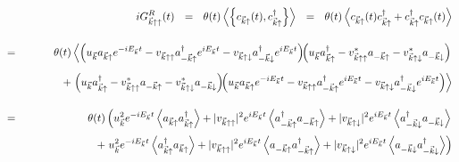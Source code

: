 \documentclass[uplatex,a4j,12pt,dvipdfmx]{jsarticle}
\begin{document}
\begin{eqnarray}
	&&
	i
	G_{\vec{k} \uparrow \uparrow}^{R}(t)
	\ \ = \ \
	\theta(t)
	\left\langle \left\{
	c_{\vec{k} \uparrow}(t), c_{\vec{k} \uparrow}^{\dagger}
	\right\} \right\rangle
	\ \ = \ \
	\theta(t)
	\left\langle
	c_{\vec{k} \uparrow}(t) c_{\vec{k} \uparrow}^{\dagger}
	+
	c_{\vec{k} \uparrow}^{\dagger} c_{\vec{k} \uparrow}(t)
	\right\rangle
	\nonumber \\[4mm] &=&
	\theta(t)
	\left\langle
	\left(
	u_{\vec{k}} a_{\vec{k} \uparrow} e^{- i E_{\vec{k}} t}
	-
	v_{\vec{k} \uparrow \uparrow} a_{-\vec{k} \uparrow}^{\dagger} e^{ i E_{\vec{k}} t}
	-
	v_{\vec{k} \uparrow \downarrow} a_{-\vec{k} \downarrow}^{\dagger} e^{ i E_{\vec{k}} t}
	\right)
	\!\!
	\left(
	u_{\vec{k}} a_{\vec{k} \uparrow}^{\dagger}
	-
	v_{\vec{k} \uparrow \uparrow}^{*} a_{-\vec{k} \uparrow}
	-
	v_{\vec{k} \uparrow \downarrow}^{*} a_{-\vec{k} \downarrow}
	\right)
	\right.
	\nonumber \\[2mm] && \hspace{12mm} +
	\left.
	\left(
	u_{\vec{k}} a_{\vec{k} \uparrow}^{\dagger}
	-
	v_{\vec{k} \uparrow \uparrow}^{*} a_{-\vec{k} \uparrow}
	-
	v_{\vec{k} \uparrow \downarrow}^{*} a_{-\vec{k} \downarrow}
	\right)
	\!\!
	\left(
	u_{\vec{k}} a_{\vec{k} \uparrow} e^{- i E_{\vec{k}} t}
	-
	v_{\vec{k} \uparrow \uparrow} a_{-\vec{k} \uparrow}^{\dagger} e^{ i E_{\vec{k}} t}
	-
	v_{\vec{k} \uparrow \downarrow} a_{-\vec{k} \downarrow}^{\dagger} e^{ i E_{\vec{k}} t}
	\right)
	\right\rangle
	\nonumber \\[4mm]
	&=&
	\theta(t)
	\left(
	u_{\vec{k}}^{2}
	e^{ - i E_{\vec{k}} t }
	\left\langle
	a_{\vec{k} \uparrow}
	a_{\vec{k} \uparrow}^{\dagger}
	\right\rangle
	+
	|v_{\vec{k} \uparrow \uparrow}|^{2}
	e^{ i E_{\vec{k}} t }
	\left\langle
	a_{-\vec{k} \uparrow}^{\dagger}
	a_{-\vec{k} \uparrow}
	\right\rangle
	+
	|v_{\vec{k} \uparrow \downarrow}|^{2}
	e^{ i E_{\vec{k}} t }
	\left\langle
	a_{-\vec{k} \downarrow}^{\dagger}
	a_{-\vec{k} \downarrow}
	\right\rangle
	\right.
	\nonumber \\[1mm] && \hspace{12mm} +
	\left.
	u_{\vec{k}}^{2}
	e^{ - i E_{\vec{k}} t }
	\left\langle
	a_{\vec{k} \uparrow}^{\dagger}
	a_{\vec{k} \uparrow}
	\right\rangle
	+
	|v_{\vec{k} \uparrow \uparrow}|^{2}
	e^{ i E_{\vec{k}} t }
	\left\langle
	a_{-\vec{k} \uparrow}
	a_{-\vec{k} \uparrow}^{\dagger}
	\right\rangle
	+
	|v_{\vec{k} \uparrow \downarrow}|^{2}
	e^{ i E_{\vec{k}} t }
	\left\langle
	a_{-\vec{k} \downarrow}
	a_{-\vec{k} \downarrow}^{\dagger}
	\right\rangle
	\right)
	\nonumber \\[4mm]

\end{eqnarray}
\end{document}
